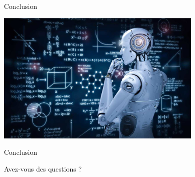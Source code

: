 
\begin{frame}{Conclusion}{}
	\begin{center}
		\includegraphics[width=10cm]{ressources/Conclusion/BrainStormRobot.jpg}
	\end{center}
\end{frame}

\begin{frame}{Conclusion}{}
	\begin{center}
		\begin{LARGE}
			Avez-vous des questions ?
		\end{LARGE}
	\end{center}
\end{frame}